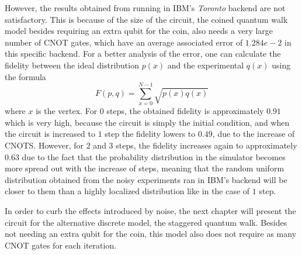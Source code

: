 \documentclass[../../dissertation.tex]{subfiles}
\begin{document}
However, the results obtained from running in IBM's \textit{Toronto} backend are not satisfactory. This is because of the size of the circuit, the coined quantum walk model besides requiring an extra qubit for the coin, also needs a very large number of CNOT gates, which have an average associated error of  $1.284e-2$ in this specific backend. For a better analysis of the error, one can calculate the fidelity between the ideal distribution $p(x)$ and the experimental $q(x)$ using the formula
\begin{equation}
    F(p,q) = \sum_{x=0}^{N-1} \sqrt{p(x)q(x)}
    \label{eq:avgFid}
\end{equation}
where $x$ is the vertex. For $0$ steps, the obtained fidelity is approximately $0.91$ which is very high, because the circuit is simply the initial condition, and when the circuit is increased to $1$ step the fidelity lowers to $0.49$, due to the increase of CNOTS. However, for $2$ and $3$ steps, the fidelity increases again to approximately $0.63$ due to the fact that the probability distribution in the simulator becomes more spread out with the increase of steps, meaning that the random uniform distribution obtained from the noisy experiments ran in IBM's backend will be closer to them than a highly localized distribution like in the case of $1$ step.\par
In order to curb the effects introduced by noise, the next chapter will present the circuit for the alternative discrete model, the staggered quantum walk. Besides not needing an extra qubit for the coin, this model also does not require as many CNOT gates for each iteration.
\end{document}
